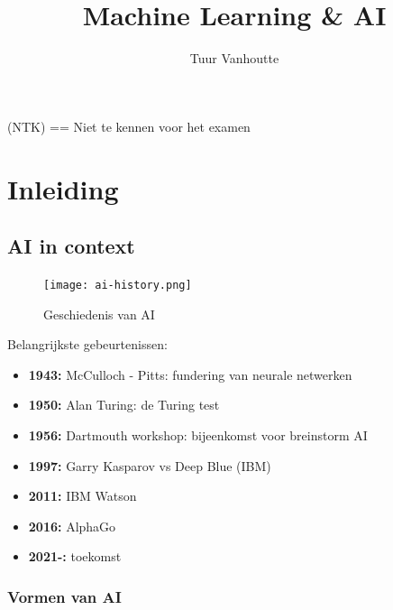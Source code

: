\documentclass{article}
\begin{document}
\begin{titlepage}
    \author{Tuur Vanhoutte}
    \title{Machine Learning \& AI}
\end{titlepage}

\maketitle
\newpage
\tableofcontents
\newpage


(NTK) == Niet te kennen voor het examen

\section{Inleiding}

\subsection{AI in context}

\begin{figure}[H]
    \centering
    \texttt{[image: ai-history.png]}
    \caption{Geschiedenis van AI}
\end{figure}

Belangrijkste gebeurtenissen:

\begin{itemize}
    \item \textbf{1943:} McCulloch - Pitts: fundering van neurale netwerken
    \item \textbf{1950:} Alan Turing: de Turing test
    \item \textbf{1956:} Dartmouth workshop: bijeenkomst voor breinstorm AI
    \item \textbf{1997:} Garry Kasparov vs Deep Blue (IBM)
    \item \textbf{2011:} IBM Watson
    \item \textbf{2016:} AlphaGo
    \item \textbf{2021-:} toekomst
\end{itemize}

\subsubsection{Vormen van AI}
\end{document}
